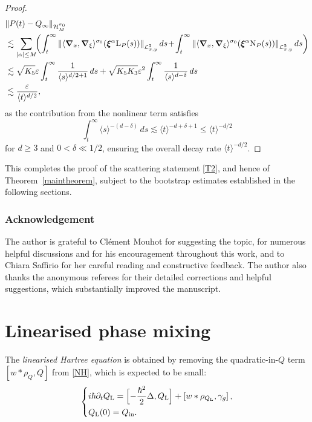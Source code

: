 \documentclass[JEP,XML,SOM,Unicode]{cedram}
\newenvironment{mycases}
{\begin{dcases*}}
{\end{dcases*}}
\theoremstyle{plain}
\theoremstyle{remark}
\newcommand{\bbbr}[1]{\biggl(#1 \biggr)}
\newcommand{\aal}{\abs{\alpha}}
\newcommand{\sBbr}[1]{\Bigl[#1\Bigr]}
\newcommand{\sbr}[1]{\left[#1\right]}
\newcommand{\p}{\partial}
\newcommand{\jb}[1]{\langle#1\rangle}
\newcommand{\ep}{\varepsilon}
\begin{document}
\begin{proof}
\begin{align*}
&\norm{P(t)-Q_\infty}_{\mathcal H^{\sigma_0}_M}\\
&\lesssim\sum_{\aal\leq M}\!\bbbr{\int_{t}^\infty \norm{\jb{\bm{\nabla}_x,\bm{\nabla}_{\xi}}^{\sigma_0}(\bm{\xi}^\alpha {\mathrm{L}_P}(s))}_{\mathcal L^2_{x,y}}\,ds\hspace{-0.05cm}+\hspace{-0.05cm}\int_{t}^\infty \norm{\jb{\bm{\nabla}_x,\bm{\nabla}_{\xi}}^{\sigma_0}(\bm{\xi}^\alpha {\mathrm{N}_P}(s))}_{\mathcal L^2_{x,y}}\,ds}\\
&\lesssim\sqrt{K_5}\ep\int_{t}^\infty\frac{1}{\jb{s}^{d/2+1}}\,ds+\sqrt{K_5 K_3}\ep^2\int_t^\infty \frac{1}{\jb{s}^{d-\delta}}\,ds\\
&\lesssim\frac{\ep}{\jb{t}^{d/2}},
\end{align*}
as the contribution from the nonlinear term satisfies\vspace*{-3pt}
\[
\int_t^\infty \jb{s}^{-(d - \delta)}\,ds \lesssim \jb{t}^{-d + \delta+1} \leq \jb{t}^{-d/2}
\]for $d\geq 3$ and $0<\delta\ll 1/2$, ensuring the overall decay rate $\jb{t}^{-d/2}$.
\end{proof}

This completes the proof of the scattering statement \eqref{T2}, and hence of Theorem~\ref{maintheorem}, subject to the bootstrap estimates established in the following sections.

\subsubsection*{Acknowledgement}
The author is grateful to Clément Mouhot for suggesting the topic, for numerous helpful discussions and for his encouragement throughout this work, and to Chiara Saffirio for her careful reading and constructive feedback. The author also thanks the anonymous referees for their detailed corrections and helpful suggestions, which substantially improved the manuscript.

\section{Linearised phase mixing}\label{linearisedsection}
The \textit{linearised Hartree equation} is obtained by removing the quadratic-in-$Q$ term $\sbr{w*\rho_Q,Q}$ from \eqref{NH}, which is expected to be small:\begin{align}
\begin{mycases}\label{LH}
i\hbar \p_t{Q_{\mathrm{L}}}=\sBbr{-{\frac{\hbar^2}{2}}\Delta,{Q_{\mathrm{L}}}}+\sbr{w*\rho_{{Q_{\mathrm{L}}}},\gamma_g},\\
{Q_{\mathrm{L}}}(0)=Q_{\mathrm{in}}.
\end{mycases}
\end{align}
\end{document}
